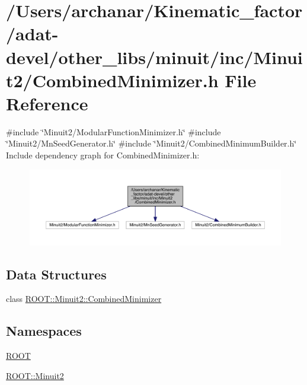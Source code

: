 \hypertarget{adat-devel_2other__libs_2minuit_2inc_2Minuit2_2CombinedMinimizer_8h}{}\section{/\+Users/archanar/\+Kinematic\+\_\+factor/adat-\/devel/other\+\_\+libs/minuit/inc/\+Minuit2/\+Combined\+Minimizer.h File Reference}
\label{adat-devel_2other__libs_2minuit_2inc_2Minuit2_2CombinedMinimizer_8h}
{\ttfamily \#include \char`\"{}Minuit2/\+Modular\+Function\+Minimizer.\+h\char`\"{}}\newline
{\ttfamily \#include \char`\"{}Minuit2/\+Mn\+Seed\+Generator.\+h\char`\"{}}\newline
{\ttfamily \#include \char`\"{}Minuit2/\+Combined\+Minimum\+Builder.\+h\char`\"{}}\newline
Include dependency graph for Combined\+Minimizer.\+h\+:
\nopagebreak
\begin{figure}[H]
\begin{center}
\leavevmode
\includegraphics[width=350pt]{dc/d7c/adat-devel_2other__libs_2minuit_2inc_2Minuit2_2CombinedMinimizer_8h__incl}
\end{center}
\end{figure}
\subsection*{Data Structures}
\begin{DoxyCompactItemize}
\item 
class \mbox{\hyperlink{classROOT_1_1Minuit2_1_1CombinedMinimizer}{R\+O\+O\+T\+::\+Minuit2\+::\+Combined\+Minimizer}}
\end{DoxyCompactItemize}
\subsection*{Namespaces}
\begin{DoxyCompactItemize}
\item 
 \mbox{\hyperlink{namespaceROOT}{R\+O\+OT}}
\item 
 \mbox{\hyperlink{namespaceROOT_1_1Minuit2}{R\+O\+O\+T\+::\+Minuit2}}
\end{DoxyCompactItemize}

